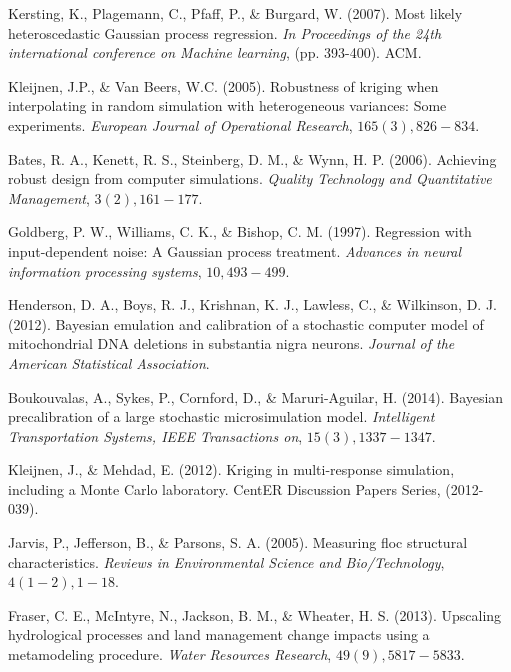 \begin{thebibliography}{94}
 Kersting, K., Plagemann, C., Pfaff, P., \& Burgard, W. (2007). Most likely heteroscedastic Gaussian process regression. {\it In Proceedings of the 24th international conference on Machine learning}, (pp. 393-400). ACM.

 Kleijnen, J.P., \& Van Beers, W.C. (2005). Robustness of kriging when interpolating in random simulation with heterogeneous variances: Some experiments. {\it European Journal of Operational Research}, $165(3), 826-834$.

 Bates, R. A., Kenett, R. S., Steinberg, D. M., \& Wynn, H. P. (2006). Achieving robust design from computer simulations. {\it Quality Technology and Quantitative Management}, $3(2), 161-177$.

 Goldberg, P. W., Williams, C. K., \& Bishop, C. M. (1997). Regression with input-dependent noise: A Gaussian process treatment. {\it Advances in neural information processing systems}, $10, 493-499$.

 Henderson, D. A., Boys, R. J., Krishnan, K. J., Lawless, C., \& Wilkinson, D. J. (2012). Bayesian emulation and calibration of a stochastic computer model of mitochondrial DNA deletions in substantia nigra neurons. {\it Journal of the American Statistical Association}.

 Boukouvalas, A., Sykes, P., Cornford, D., \& Maruri-Aguilar, H. (2014). Bayesian precalibration of a large stochastic microsimulation model. {\it Intelligent Transportation Systems, IEEE Transactions on}, $15(3), 1337-1347$.

 Kleijnen, J., \& Mehdad, E. (2012). Kriging in multi-response simulation, including a Monte Carlo laboratory. {CentER Discussion Papers Series}, (2012-039).

 Jarvis, P., Jefferson, B., \& Parsons, S. A. (2005). Measuring floc structural characteristics. {\it Reviews in Environmental Science and Bio/Technology}, $4(1-2), 1-18$.

  Fraser, C. E., McIntyre, N., Jackson, B. M., \& Wheater, H. S. (2013). Upscaling hydrological processes and land management change impacts using a metamodeling procedure. {\it Water Resources Research}, $49(9), 5817-5833$.


\end{thebibliography}
